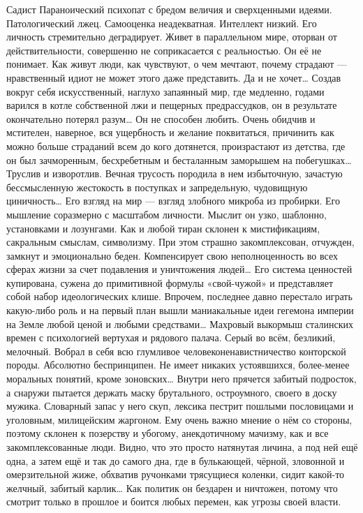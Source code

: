 Садист
Параноический психопат с бредом величия и сверхценными идеями.
Патологический лжец.
Самооценка неадекватная.
Интеллект низкий.
Его личность стремительно деградирует.
Живет в параллельном мире, оторван от действительности, совершенно не соприкасается с реальностью.
Он её не понимает.
Как живут люди, как чувствуют, о чем мечтают, почему страдают — нравственный идиот не может этого даже представить.
Да и не хочет…
Создав вокруг себя искусственный, наглухо запаянный мир, где медленно, годами варился в котле собственной лжи и пещерных предрассудков, он в результате окончательно потерял разум…
Он не способен любить.
Очень обидчив и мстителен, наверное, вся ущербность и желание поквитаться, причинить как можно больше страданий всем до кого дотянется, произрастают из детства, где он был зачморенным, бесхребетным и бесталанным заморышем на побегушках…
Труслив и изворотлив.
Вечная трусость породила в нем избыточную, зачастую бессмысленную жестокость в поступках и запредельную, чудовищную циничность…
Его взгляд на мир — взгляд злобного микроба из пробирки.
Его мышление соразмерно с масштабом личности. Мыслит он узко, шаблонно, установками и лозунгами.
Как и любой тиран склонен к мистификациям, сакральным смыслам, символизму.
При этом страшно закомплексован, отчужден, замкнут и эмоционально беден.
Компенсирует свою неполноценность во всех сферах жизни за счет подавления и уничтожения людей…
Его система ценностей купирована, сужена до примитивной формулы «свой-чужой» и представляет собой набор идеологических клише.
Впрочем, последнее давно перестало играть какую-либо роль и на первый план вышли маниакальные идеи гегемона империи на Земле любой ценой и любыми средствами…
Махровый выкормыш сталинских времен с психологией вертухая и рядового палача.
Серый во всём, безликий, мелочный.
Вобрал в себя всю глумливое человеконенавистничество конторской породы. Абсолютно беспринципен.
Не имеет никаких устоявшихся, более-менее моральных понятий, кроме зоновских…
Внутри него прячется забитый подросток, а снаружи пытается держать маску брутального, остроумного, своего в доску мужика.
Словарный запас у него скуп, лексика пестрит пошлыми пословицами и уголовным, милицейским жаргоном.
Ему очень важно мнение о нём со стороны, поэтому склонен к позерству и убогому, анекдотичному мачизму, как и все закомплексованные люди.
Видно, что это просто натянутая личина, а под ней ещё одна, а затем ещё и так до самого дна, где в булькающей, чёрной, зловонной и омерзительной жиже, обхватив ручонками трясущиеся коленки, сидит какой-то желчный, забитый карлик…
Как политик он бездарен и ничтожен, потому что смотрит только в прошлое и боится любых перемен, как угрозы своей власти.
